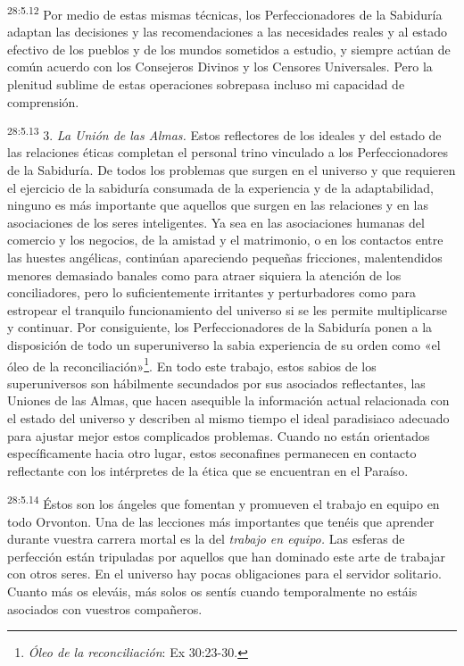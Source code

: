 \par
\textsuperscript{28:5.12} Por medio de estas mismas técnicas, los Perfeccionadores de la Sabiduría adaptan las decisiones y las recomendaciones a las necesidades reales y al estado efectivo de los pueblos y de los mundos sometidos a estudio, y siempre actúan de común acuerdo con los Consejeros Divinos y los Censores Universales. Pero la plenitud sublime de estas operaciones sobrepasa incluso mi capacidad de comprensión.

\par
\textsuperscript{28:5.13} 3. \textit{La Unión de las Almas.} Estos reflectores de los ideales y del estado de las relaciones éticas completan el personal trino vinculado a los Perfeccionadores de la Sabiduría. De todos los problemas que surgen en el universo y que requieren el ejercicio de la sabiduría consumada de la experiencia y de la adaptabilidad, ninguno es más importante que aquellos que surgen en las relaciones y en las asociaciones de los seres inteligentes. Ya sea en las asociaciones humanas del comercio y los negocios, de la amistad y el matrimonio, o en los contactos entre las huestes angélicas, continúan apareciendo pequeñas fricciones, malentendidos menores demasiado banales como para atraer siquiera la atención de los conciliadores, pero lo suficientemente irritantes y perturbadores como para estropear el tranquilo funcionamiento del universo si se les permite multiplicarse y continuar. Por consiguiente, los Perfeccionadores de la Sabiduría ponen a la disposición de todo un superuniverso la sabia experiencia de su orden como «el óleo de la reconciliación»\footnote{\textit{Óleo de la reconciliación}: Ex 30:23-30.}. En todo este trabajo, estos sabios de los superuniversos son hábilmente secundados por sus asociados reflectantes, las Uniones de las Almas, que hacen asequible la información actual relacionada con el estado del universo y describen al mismo tiempo el ideal paradisiaco adecuado para ajustar mejor estos complicados problemas. Cuando no están orientados específicamente hacia otro lugar, estos seconafines permanecen en contacto reflectante con los intérpretes de la ética que se encuentran en el Paraíso.

\par
\textsuperscript{28:5.14} Éstos son los ángeles que fomentan y promueven el trabajo en equipo en todo Orvonton. Una de las lecciones más importantes que tenéis que aprender durante vuestra carrera mortal es la del \textit{trabajo en equipo.} Las esferas de perfección están tripuladas por aquellos que han dominado este arte de trabajar con otros seres. En el universo hay pocas obligaciones para el servidor solitario. Cuanto más os eleváis, más solos os sentís cuando temporalmente no estáis asociados con vuestros compañeros.

